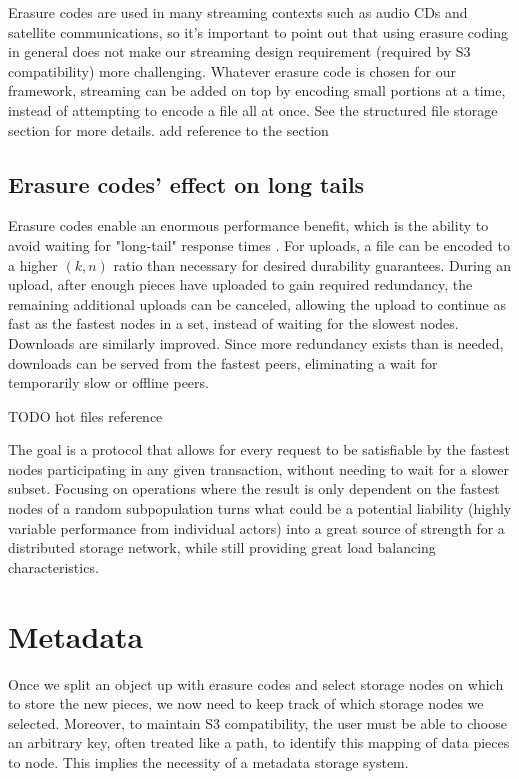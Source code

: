 \documentclass[11pt,fleqn,openany]{book}
\newcommand{\todo}[1]{{\color{red} TODO #1 }}
\newcommand{\bs}[1]{{\color{red}#1}}
\begin{document}
Erasure codes are used in many streaming contexts such as audio CDs and
satellite communications, so it's important to point out that using erasure
coding in general does not make our streaming design requirement
(required by S3 compatibility) more challenging.
Whatever erasure code is chosen for our framework, streaming can be
added on top by encoding small portions at a time, instead of attempting to
encode a file all at once. See the structured file storage section for more
details. \bs{add reference to the section}

\subsection{Erasure codes' effect on long tails}

Erasure codes enable an enormous performance benefit, which is the ability to
avoid waiting for "long-tail" response times \cite{tail-at-scale}. For uploads,
a file can be encoded to a higher $(k, n)$ ratio than necessary for desired
durability guarantees.
During an upload, after enough pieces have uploaded to gain required
redundancy, the remaining additional uploads can be canceled, allowing the
upload to continue as fast as the fastest nodes in a set, instead of waiting
for the slowest nodes.
Downloads are similarly improved. Since more redundancy exists
than is needed, downloads can be served from the fastest peers, eliminating a
wait for temporarily slow or offline peers.

\todo{hot files reference}

The goal is a protocol that allows for every request to be satisfiable by the
fastest nodes participating in any given transaction, without needing to wait
for a slower subset.
Focusing on operations where the result is only dependent on the fastest
nodes of a random subpopulation turns what could be a potential liability
(highly variable performance from individual actors) into a great source of
strength for a distributed storage network, while still providing great load
balancing characteristics.

\section{Metadata}

Once we split an object up with erasure codes and select storage nodes on
which to store the new pieces, we now need to keep track of which storage
nodes we selected.
Moreover, to maintain S3 compatibility, the user must be able to choose an
arbitrary key, often treated like a path, to identify this mapping of data
pieces to node. This implies the necessity of a metadata storage system.
\end{document}
